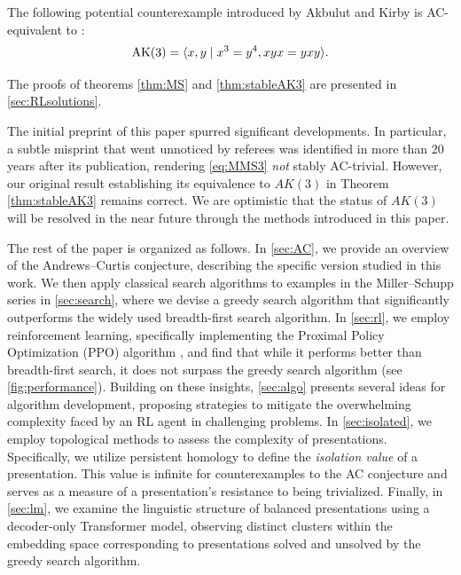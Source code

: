 \begin{theorem}\label{thm:stableAK3}
	The following potential counterexample introduced by Akbulut and Kirby \cite{Akbulut--Kirby} is AC-equivalent to :
	\[
	\text{AK}(3) = \langle x, y \mid x^3 = y^{4}, xyx = yxy\rangle.
	\]
\end{theorem}

\medskip\noindent
The proofs of theorems \ref{thm:MS} and \ref{thm:stableAK3} are presented in \autoref{sec:RLsolutions}.

The initial preprint of this paper spurred significant developments. In particular, a subtle misprint that went unnoticed by referees was identified in \cite{MMS} more than 20 years after its publication, rendering \eqref{eq:MMS3} \textit{not} stably AC-trivial. However, our original result establishing its equivalence to $AK(3)$ in Theorem \ref{thm:stableAK3} remains correct. We are optimistic that the status of $AK(3)$ will be resolved in the near future through the methods introduced in this paper.

The rest of the paper is organized as follows. In \autoref{sec:AC}, we provide an overview of the Andrews--Curtis conjecture, describing the specific version studied in this work. We then apply classical search algorithms to examples in the Miller--Schupp series in \autoref{sec:search}, where we devise a greedy search algorithm that significantly outperforms the widely used breadth-first search algorithm. In \autoref{sec:rl}, we employ reinforcement learning, specifically implementing the Proximal Policy Optimization (PPO) algorithm \cite{schulman2017proximal}, and find that while it performs better than breadth-first search, it does not surpass the greedy search algorithm (see \autoref{fig:performance}). Building on these insights, \autoref{sec:algo} presents several ideas for algorithm development, proposing strategies to mitigate the overwhelming complexity faced by an RL agent in challenging problems. In \autoref{sec:isolated}, we employ topological methods to assess the complexity of presentations. Specifically, we utilize persistent homology to define the \textit{isolation value} of a presentation. This value is infinite for counterexamples to the AC conjecture and serves as a measure of a presentation's resistance to being trivialized. Finally, in \autoref{sec:lm}, we examine the linguistic structure of balanced presentations using a decoder-only Transformer model, observing distinct clusters within the embedding space corresponding to presentations solved and unsolved by the greedy search algorithm.

